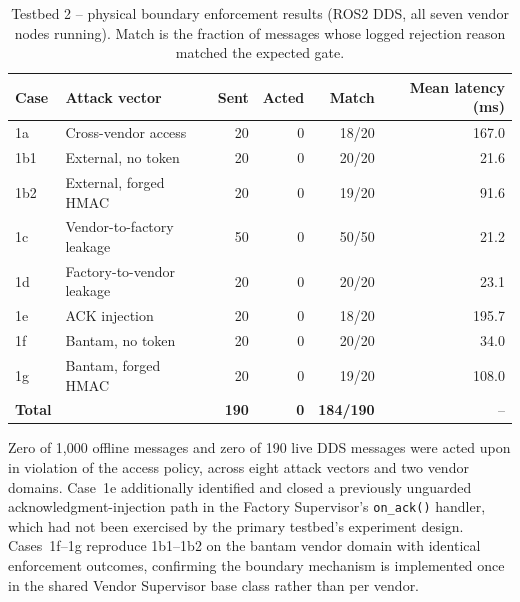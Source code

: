 \documentclass[a4paper,fleqn]{cas-dc}
\begin{document}
\begin{table}[h]
\centering
\caption{Testbed 2 -- physical boundary enforcement results (ROS2 DDS, all seven vendor nodes running). Match is the fraction of messages whose logged rejection reason matched the expected gate.}
\label{tab:testbed2_boundary}
\begin{tabular}{llrrrr}
\toprule
\textbf{Case} & \textbf{Attack vector} & \textbf{Sent} & \textbf{Acted} & \textbf{Match} & \textbf{Mean latency (ms)} \\
\midrule
1a  & Cross-vendor access        & 20  & 0 & 18/20   & 167.0 \\
1b1 & External, no token         & 20  & 0 & 20/20   & 21.6  \\
1b2 & External, forged HMAC      & 20  & 0 & 19/20   & 91.6  \\
1c  & Vendor-to-factory leakage  & 50  & 0 & 50/50   & 21.2  \\
1d  & Factory-to-vendor leakage  & 20  & 0 & 20/20   & 23.1  \\
1e  & ACK injection              & 20  & 0 & 18/20   & 195.7 \\
1f  & Bantam, no token           & 20  & 0 & 20/20   & 34.0  \\
1g  & Bantam, forged HMAC        & 20  & 0 & 19/20   & 108.0 \\
\midrule
\textbf{Total} & & \textbf{190} & \textbf{0} & \textbf{184/190} & -- \\
\bottomrule
\end{tabular}
\end{table}

Zero of 1,000 offline messages and zero of 190 live DDS messages were acted upon in violation of the access policy, across eight attack vectors and two vendor domains. Case~1e additionally identified and closed a previously unguarded acknowledgment-injection path in the Factory Supervisor's \texttt{on\_ack()} handler, which had not been exercised by the primary testbed's experiment design. Cases~1f--1g reproduce 1b1--1b2 on the bantam vendor domain with identical enforcement outcomes, confirming the boundary mechanism is implemented once in the shared Vendor Supervisor base class rather than per vendor.
\end{document}
